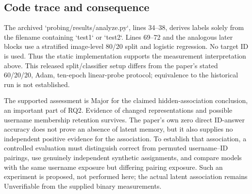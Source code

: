 \documentclass[10pt]{article}
\begin{document}
\subsection*{Code trace and consequence}
The archived `probing/results/analyze.py`, lines 34–38, derives labels solely from the filename containing `test1` or `test2`. Lines 69–72 and the analogous later blocks use a stratified image-level 80/20 split and logistic regression. No target ID is used. Thus the static implementation supports the measurement interpretation above. This released split/classifier setup differs from the paper’s stated 60/20/20, Adam, ten-epoch linear-probe protocol; equivalence to the historical run is not established.\par
The supported assessment is Major for the claimed hidden-association conclusion, an important part of RQ2. Evidence of changed representations and possible username membership retention survives. The paper’s own zero direct ID-answer accuracy does not prove an absence of latent memory, but it also supplies no independent positive evidence for the association. To establish that association, a controlled evaluation must distinguish correct from permuted username–ID pairings, use genuinely independent synthetic assignments, and compare models with the same username exposure but differing pairing exposure. Such an experiment is proposed, not performed here; the actual latent association remains Unverifiable from the supplied binary measurements.\par
\end{document}
